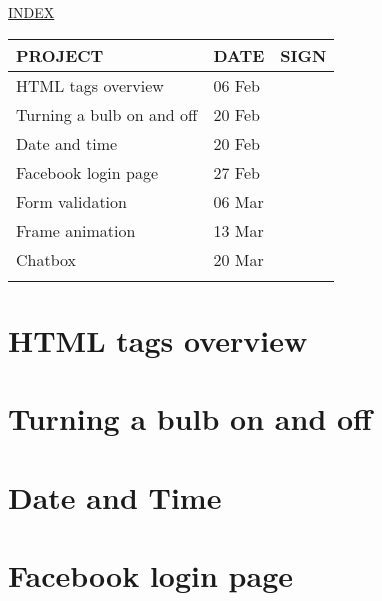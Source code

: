 \documentclass[12pt]{article}
\begin{document}

\Huge
{}
\centering \underline{INDEX} \\
\vspace*{3\baselineskip}
\setlength{\arrayrulewidth}{0.4mm}
\renewcommand{\arraystretch}{1.8}
\setlength{\tabcolsep}{10pt}

\LARGE
\begin{tabular}{|m{8.5cm}|m{2.2cm}|m{3cm}|}
  \hline
  PROJECT & DATE & SIGN \\
  \hline
  \hline
  HTML tags overview & 06 Feb & \\
  Turning a bulb on and off & 20 Feb & \\
  Date and time & 20 Feb & \\
  Facebook login page & 27 Feb & \\
  Form validation & 06 Mar & \\
  Frame animation & 13 Mar & \\
  Chatbox & 20 Mar & \\
  & & \\
  \hline
\end{tabular}
\newpage
\restoregeometry
\normalsize

\section{HTML tags overview}
\newpage

\section{Turning a bulb on and off}
\newpage

\section{Date and Time}

\section{Facebook login page}
\newpage
\end{document}
